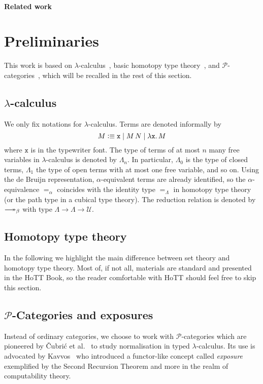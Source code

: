 \documentclass[a4paper,UKenglish,numberwithinsect,cleveref,thm-restate]{lipics-v2021}
\numberwithin{equation}{section}
\newcommand{\PP}{\mathscr{P}}
\newcommand{\defeq}{\vcentcolon\equiv}
\newcommand{\Univ}{\mathcal{U}}
\DeclareRobustCommand\longtwoheadrightarrow{\relbar\joinrel\twoheadrightarrow}
\newcommand{\reduce}{\longtwoheadrightarrow_{\beta}}
\theoremstyle{plain}
\begin{document}
\paragraph*{Related work}
\cite{Visser2019,Beklemishev2006}
\cite{Kavvos2020}
\cite{Shamkanov2014,Shamkanov2016a}

\section{Preliminaries}\label{sec:preliminaries}
This work is based on $\lambda$-calculus~\cite{Barendregt1984a}, basic homotopy type theory~\cite{hottbook}, and $\PP$-categories~\cite{Cubric1998a}, which will be recalled in the rest of this section.

\subsection{\texorpdfstring{$\lambda$}{λ}-calculus}
We only fix notations for $\lambda$-calculus.
Terms are denoted informally by
\[
  M \defeq \mathtt{x} \mid M\,N \mid \lambda \mathtt{x}.\, M
\]
where $\mathtt{x}$ is in the typewriter font.
The type of terms of at most $n$ many free variables in $\lambda$-calculus is denoted by $\Lambda_n$.
In particular, $\Lambda_0$ is the type of closed terms, $\Lambda_1$ the type of open terms with at most one free variable, and so on.
Using the de Bruijn representation, 
$\alpha$-equivalent terms are already identified, so the $\alpha$-equivalence $=_\alpha$ coincides with the identity type $=_\Lambda$ in homotopy type theory (or the path type in a cubical type theory).
The reduction relation is denoted by $\reduce$ with type $\Lambda \to \Lambda \to \Univ$.

\subsection{Homotopy type theory}
In the following we highlight the main difference between set theory and homotopy type theory.
Most of, if not all, materials are standard and presented in the HoTT Book, so the reader comfortable with HoTT should feel free to skip this section.

\subsection{\texorpdfstring{$\PP$}{P}-Categories and exposures}
Instead of ordinary categories, we choose to work with $\PP$-categories which are pioneered by \v{C}ubri\'c et al.~\cite{Cubric1998a} to study normalisation in typed $\lambda$-calculus.
Its use is advocated by Kavvos~\cite{Kavvos2017b} who introduced a functor-like concept called \emph{exposure} exemplified by the Second Recursion Theorem and more in the realm of computability theory.
\end{document}
